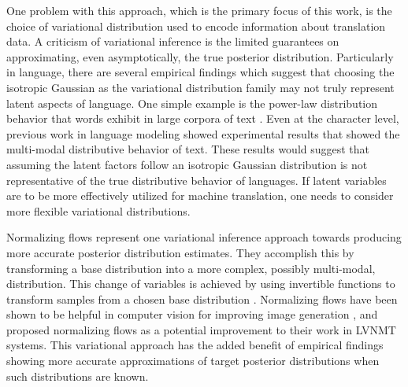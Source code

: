 
One problem with this approach, which is the primary focus of this work, is the choice of variational distribution used to encode information about translation data. A criticism of variational inference is the limited guarantees on approximating, even asymptotically, the true posterior distribution. Particularly in language, there are several empirical findings which suggest that choosing the isotropic Gaussian as the variational distribution family may not truly represent latent aspects of language. One simple example is the power-law distribution behavior that words exhibit in large corpora of text \cite{koehnSMT2010}. Even at the character level, previous work in language modeling showed experimental results that showed the multi-modal distributive behavior of text\cite{ziegler2019LatentNFforDiscrete}. These results would suggest that assuming the latent factors follow an isotropic Gaussian distribution is not representative of the true distributive behavior of languages. If latent variables are to be more effectively utilized for machine translation, one needs to consider more flexible variational distributions. 

Normalizing flows represent one variational inference approach towards producing more accurate posterior distribution estimates. They accomplish this by transforming a base distribution into a more complex, possibly multi-modal, distribution. This change of variables is achieved by using invertible functions to transform samples from a chosen base distribution \cite{rezende2015VIwithNF}. Normalizing flows have been shown to be helpful in computer vision for improving image generation \cite{ kingma2016IAF, tomczak2016Householder,kingma2018GLOW, Berg2018SylvesterNF}, and \citet{schulz2018StochasticDecoder} proposed normalizing flows as a potential improvement to their work in LVNMT systems. This variational approach has the added benefit of empirical findings showing more accurate approximations of target posterior distributions when such distributions are known.

